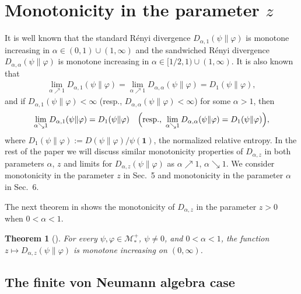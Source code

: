 \documentclass[12pt]{article}
\newtheorem{theorem}{Theorem}[section]
\theoremstyle{definition}
\theoremstyle{remark}
\numberwithin{equation}{section}
\def\cM{\mathcal M}
\def\ffi{\varphi}
\def\1{\mathbf{1}}
\begin{document}
\section{Monotonicity in the parameter $z$}

It is well known \cite{berta2018renyi,hiai2018quantum,jencova2018renyi} that the standard R\'enyi divergence
$D_{\alpha,1}(\psi\|\ffi)$ is monotone increasing in $\alpha\in(0,1)\cup(1,\infty)$ and the sandwiched R\'enyi
divergence $D_{\alpha,\alpha}(\psi\|\ffi)$ is monotone increasing in $\alpha\in[1/2,1)\cup(1,\infty)$. It is also
known \cite{berta2018renyi,hiai2018quantum,jencova2018renyi} that
\begin{align}\label{F-5.1}
\lim_{\alpha\nearrow1}D_{\alpha,1}(\psi\|\ffi)=\lim_{\alpha\nearrow1}D_{\alpha,\alpha}(\psi\|\ffi)
=D_1(\psi\|\ffi),
\end{align}
and if $D_{\alpha,1}(\psi\|\ffi)<\infty$ (resp., $D_{\alpha,\alpha}(\psi\|\ffi)<\infty$) for some $\alpha>1$, then
\begin{align}\label{F-5.2}
\lim_{\alpha\searrow1}D_{\alpha,1}(\psi\|\ffi)=D_1(\psi\|\ffi)\quad
\Bigl(\mbox{resp.,}\ \lim_{\alpha\searrow1}D_{\alpha,\alpha}(\psi\|\ffi)=D_1(\psi\|\ffi)\Bigr),
\end{align}
where $D_1(\psi\|\ffi):=D(\psi\|\ffi)/\psi(\1)$, the normalized relative entropy.
In the rest of the paper we will discuss similar monotonicity properties {of $D_{\alpha,z}$ in
both parameters $\alpha$, $z$ and limits for $D_{\alpha,z}(\psi\|\ffi)$ as
$\alpha\nearrow1$, $\alpha\searrow1$.} We consider monotonicity in the parameter $z$ in Sec.~5
and monotonicity in the parameter $\alpha$ in Sec.~6.

The next theorem in \cite{kato2023onrenyi} shows the monotonicity of $D_{\alpha,z}$ in the
parameter $z>0$ when $0<\alpha<1$.

\begin{theorem}[\mbox{\cite[Theorem 1(x)]{kato2023onrenyi}}]\label{T-5.1}
For every $\psi,\ffi\in\cM_*^+$, $\psi\ne0$, and $0<\alpha<1$, the function
$z\mapsto D_{\alpha,z}(\psi\|\ffi)$ is monotone increasing on $(0,\infty)$.
\end{theorem}

\subsection{The finite von Neumann algebra case}
\end{document}
